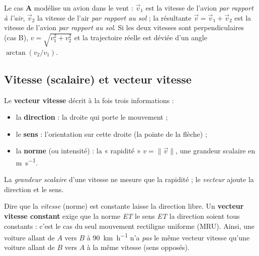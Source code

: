 \documentclass[11pt,a4paper]{article}
\newcommand{\vv}[1]{\vec{#1}}
\begin{document}
\begin{exemple}
Le cas \textbf{A} modélise un avion dans le vent :
$\vv{v}_1$ est la vitesse de l'avion \emph{par rapport à l'air}, $\vv{v}_2$ la vitesse de l'air
\emph{par rapport au sol} ; la résultante $\vv{v}=\vv{v}_1+\vv{v}_2$ est la vitesse de l'avion
\emph{par rapport au sol}. Si les deux vitesses sont perpendiculaires (cas B),
$v=\sqrt{v_1^2+v_2^2}$ et la trajectoire réelle est déviée d'un angle $\arctan(v_2/v_1)$.
\end{exemple}

\subsection{Vitesse (scalaire) et vecteur vitesse}

\begin{definition}
Le \textbf{vecteur vitesse} décrit à la fois trois informations :
\begin{itemize}[leftmargin=1.6em,topsep=2pt,itemsep=1pt]
  \item la \textbf{direction} : la droite qui porte le mouvement ;
  \item le \textbf{sens} : l'orientation sur cette droite (la pointe de la flèche) ;
  \item la \textbf{norme} (ou intensité) : la « rapidité » $v=\lVert\vv{v}\rVert$, une grandeur scalaire en \si{\metre\per\second}.
\end{itemize}
La \emph{grandeur scalaire} d'une vitesse ne mesure que la rapidité ; le \emph{vecteur} ajoute la direction et le sens.
\end{definition}

\begin{center}
\end{center}

\begin{attention}
Dire que la \emph{vitesse} (norme) est constante laisse la direction libre.
Un \textbf{vecteur vitesse constant} exige que la norme \emph{ET} le sens \emph{ET} la direction
soient tous constants : c'est le cas du seul mouvement rectiligne uniforme (MRU).
Ainsi, une voiture allant de $A$ vers $B$ à \qty{90}{\kilo\metre\per\hour} n'a \emph{pas} le même
vecteur vitesse qu'une voiture allant de $B$ vers $A$ à la même vitesse (sens opposés).
\end{attention}
\end{document}
